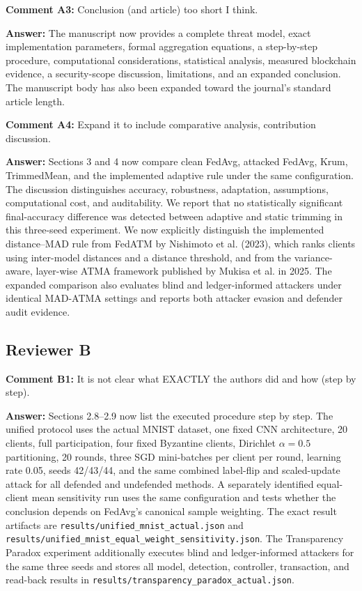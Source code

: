 \documentclass[10pt,letterpaper]{article}
\begin{document}
\textbf{Comment A3:} Conclusion (and article) too short I think.

\textbf{Answer:} The manuscript now provides a complete threat model, exact
implementation parameters, formal aggregation equations, a step-by-step
procedure, computational considerations, statistical analysis, measured
blockchain evidence, a security-scope discussion, limitations, and an expanded
conclusion. The manuscript body has also been expanded toward the journal's
standard article length.

\textbf{Comment A4:} Expand it to include comparative analysis, contribution
discussion.

\textbf{Answer:} Sections 3 and 4 now compare clean FedAvg, attacked FedAvg,
Krum, TrimmedMean, and the implemented adaptive rule under the same configuration.
The discussion distinguishes accuracy, robustness, adaptation, assumptions,
computational cost, and auditability. We report that no statistically significant
final-accuracy difference was detected between adaptive and static trimming in
this three-seed experiment. We now explicitly distinguish the implemented
distance--MAD rule from FedATM by Nishimoto et al. (2023), which ranks clients
using inter-model distances and a distance threshold, and from the variance-aware,
layer-wise ATMA framework published by Mukisa et al. in 2025.
The expanded comparison also evaluates blind and ledger-informed attackers under
identical MAD-ATMA settings and reports both attacker evasion and defender audit
evidence.

\subsection*{Reviewer B}
\textbf{Comment B1:} It is not clear what EXACTLY the authors did and how
(step by step).

\textbf{Answer:} Sections 2.8--2.9 now list the executed procedure step by step.
The unified protocol uses the actual MNIST dataset, one fixed CNN architecture,
20 clients, full participation, four fixed Byzantine clients, Dirichlet
$\alpha=0.5$ partitioning, 20 rounds, three SGD mini-batches per client per
round, learning rate 0.05, seeds 42/43/44, and the same combined label-flip and
scaled-update attack for all defended and undefended methods. A separately
identified equal-client mean sensitivity run uses the same configuration and
tests whether the conclusion depends on FedAvg's canonical sample weighting.
The exact result artifacts are \texttt{results/unified\_mnist\_actual.json} and
\texttt{results/unified\_mnist\_equal\_weight\_sensitivity.json}. The
Transparency Paradox experiment additionally executes blind and ledger-informed
attackers for the same three seeds and stores all model, detection, controller,
transaction, and read-back results in
\texttt{results/transparency\_paradox\_actual.json}.
\end{document}
